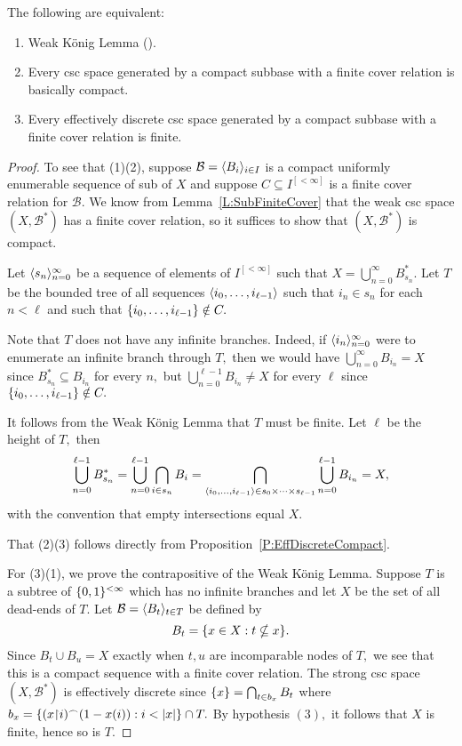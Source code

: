 \documentclass[csc]{subfiles}
\begin{document}
\begin{theorem}[\RCA]\label{T:AlexanderWKL}
  The following are equivalent:
  \begin{enumerate}[\upshape(1)]
  \item Weak K{\"o}nig Lemma \textup(\WKL\textup).
  \item Every csc space generated by a compact subbase with a finite cover relation is basically compact.
  \item Every effectively discrete csc space generated by a compact subbase with a finite cover relation is finite.
  \end{enumerate}
\end{theorem}

\begin{proof}
  To see that (1)\THEN(2), suppose \(\mathcal{B} = \langle B_i\rangle_{i \in I}\) is a compact uniformly enumerable sequence of sub of \(X\) and suppose \(C \subseteq I^{[<\infty]}\) is a finite cover relation for \(\mathcal{B}.\)
  We know from Lemma~\ref{L:SubFiniteCover} that the weak csc space \((X,\mathcal{B}^*)\) has a finite cover relation, so it suffices to show that \((X,\mathcal{B}^*)\) is compact.

  Let \(\langle s_n\rangle_{n=0}^\infty\) be a sequence of elements of \(I^{[<\infty]}\) such that \(X = \bigcup_{n=0}^\infty B^*_{s_n}.\)
  Let \(T\) be the bounded tree of all sequences \(\langle i_0,\dots,i_{\ell-1}\rangle\) such that \(i_n \in s_n\) for each \(n < \ell\) and such that \(\lbrace i_0,\dots,i_{\ell-1}\rbrace \notin C.\)

  Note that \(T\) does not have any infinite branches.
  Indeed, if \(\langle i_n\rangle_{n=0}^\infty\) were to enumerate an infinite branch through \(T,\) then we would have \(\bigcup_{n=0}^\infty B_{i_n} = X\) since \(B^*_{s_n} \subseteq B_{i_n}\) for every \(n,\) but \(\bigcup_{n=0}^{\ell-1} B_{i_n} \neq X\) for every \(\ell\) since \(\lbrace i_0,\dots,i_{\ell-1}\rbrace \notin C.\)
 
  It follows from the Weak K{\"o}nig Lemma that \(T\) must be finite. 
  Let \(\ell\) be the height of \(T,\) then
  \[\bigcup_{n=0}^{\ell-1} B^*_{s_n} = \bigcup_{n=0}^{\ell-1} \bigcap_{i \in s_n} B_i = \bigcap_{\langle i_0,\dots,i_{\ell-1}\rangle \in s_0\times\cdots\times s_{\ell-1}} \bigcup_{n=0}^{\ell-1} B_{i_n} = X,\] with the convention that empty intersections equal \(X.\)

  That (2)\THEN(3) follows directly from Proposition~\ref{P:EffDiscreteCompact}.

  For (3)\THEN(1), we prove the contrapositive of the Weak K{\"o}nig Lemma.
  Suppose \(T\) is a subtree of \(\lbrace0,1\rbrace^{<\infty}\) which has no infinite branches and let \(X\) be the set of all dead-ends of \(T.\)
  Let \(\mathcal{B} = \langle B_t\rangle_{t \in T}\) be defined by \[B_t = \lbrace x \in X : t \nsubseteq x\rbrace.\]
  Since \(B_t \cup B_u = X\) exactly when \(t, u\) are incomparable nodes of \(T,\) we see that this is a compact sequence with a finite cover relation.
  The strong csc space \((X,\mathcal{B}^*)\) is effectively discrete since \(\lbrace x\rbrace = \bigcap_{t \in b_x} B_t\) where \(b_x = \lbrace(x {\upharpoonright} i){{}^\frown}(1-x(i)) : i < |x|\rbrace \cap T.\)
  By hypothesis \((3),\) it follows that \(X\) is finite, hence so is \(T.\)
\end{proof}
\end{document}
